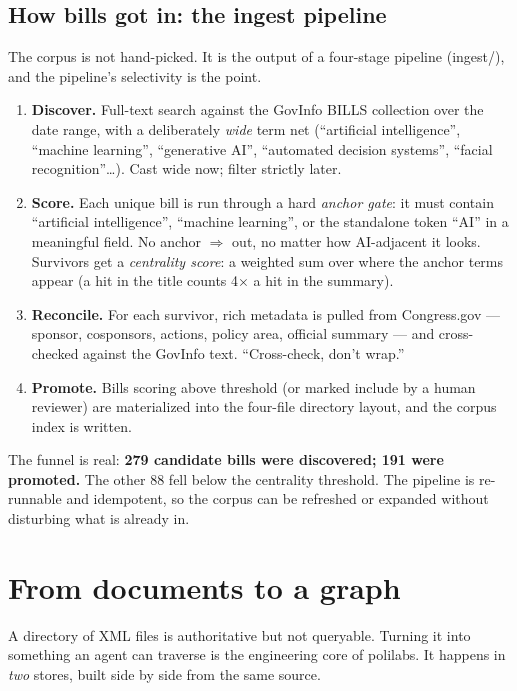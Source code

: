\documentclass[11pt]{article}
\newcommand{\code}[1]{{\ttfamily\small #1}}
\begin{document}
\subsection{How bills got in: the ingest pipeline}

The corpus is not hand-picked. It is the output of a four-stage pipeline
(\code{ingest/}), and the pipeline's selectivity is the point.

\begin{enumerate}[leftmargin=1.5em,itemsep=3pt]
\item \textbf{Discover.} Full-text search against the GovInfo \code{BILLS}
  collection over the date range, with a deliberately \emph{wide} term net
  (``artificial intelligence'', ``machine learning'', ``generative AI'',
  ``automated decision systems'', ``facial recognition''\ldots). Cast wide now;
  filter strictly later.
\item \textbf{Score.} Each unique bill is run through a hard \emph{anchor gate}:
  it must contain ``artificial intelligence'', ``machine learning'', or the
  standalone token ``AI'' in a meaningful field. No anchor $\Rightarrow$ out,
  no matter how AI-adjacent it looks. Survivors get a \emph{centrality score}:
  a weighted sum over where the anchor terms appear (a hit in the title counts
  4$\times$ a hit in the summary).
\item \textbf{Reconcile.} For each survivor, rich metadata is pulled from
  Congress.gov --- sponsor, cosponsors, actions, policy area, official summary
  --- and cross-checked against the GovInfo text. ``Cross-check, don't wrap.''
\item \textbf{Promote.} Bills scoring above threshold (or marked include by a
  human reviewer) are materialized into the four-file directory layout, and the
  corpus index is written.
\end{enumerate}

The funnel is real: \textbf{279 candidate bills were discovered; 191 were
promoted.} The other 88 fell below the centrality threshold. The pipeline is
re-runnable and idempotent, so the corpus can be refreshed or expanded without
disturbing what is already in.

\section{From documents to a graph}

A directory of XML files is authoritative but not queryable. Turning it into
something an agent can traverse is the engineering core of polilabs. It happens
in \emph{two} stores, built side by side from the same source.
\end{document}
